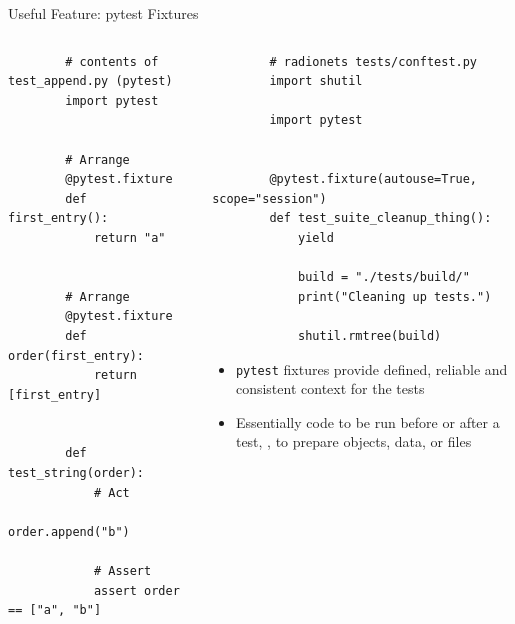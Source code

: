 \begin{darkframe}[fragile]{Useful Feature: pytest Fixtures}
  \begin{columns}[t,onlytextwidth]
    \begin{column}{0.38\textwidth}
      \small
      \begin{verbatim}
        # contents of test_append.py (pytest)
        import pytest


        # Arrange
        @pytest.fixture
        def first_entry():
            return "a"


        # Arrange
        @pytest.fixture
        def order(first_entry):
            return [first_entry]


        def test_string(order):
            # Act
            order.append("b")

            # Assert
            assert order == ["a", "b"]
      \end{verbatim}
    \end{column}
    \begin{column}{0.58\textwidth}
      \small
      \begin{verbatim}
        # radionets tests/conftest.py
        import shutil

        import pytest


        @pytest.fixture(autouse=True, scope="session")
        def test_suite_cleanup_thing():
            yield

            build = "./tests/build/"
            print("Cleaning up tests.")

            shutil.rmtree(build)
      \end{verbatim}
      \vspace{0.5cm}
      \normalsize
      \begin{itemize}
        \item [\to] \texttt{pytest} fixtures provide defined, reliable and consistent context for the tests
        \item [\to] Essentially code to be run before or after a test, \eg, to prepare objects, data, or files
      \end{itemize}
    \end{column}
  \end{columns}
\end{darkframe}

